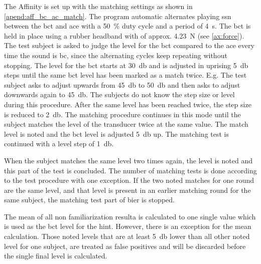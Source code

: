 The Affinity is set up with the matching settings as shown in \autoref{apend:aff_bc_ac_match}. The program automatic alternates playing \gls{ssn} between the \gls{bct} and \gls{ace} with a \SI{50}{\percent} duty cycle and a period of \SI{4}{\second}. The \gls{bct} is held in place using a rubber headband with of approx. \SI{4.23}{\newton} (see \autoref{ax:force}). The test subject is asked to judge the level for the \gls{bct} compared to the \gls{ace} every time the sound is \gls{bc}, since the alternating cycles keep repeating without stopping. The level for the \gls{bct} starts at \SI{30}{\decibel} and is adjusted in uprising \SI{5}{\decibel} steps until the same \gls{bct} level has been marked as a match twice. E.g. The test subject asks to adjust upwards from \SI{45}{\decibel} to \SI{50}{\decibel} and then asks to adjust downwards again to \SI{45}{\decibel}. The subjects do not know the step size or level during this procedure. 
After the same level has been reached twice, the step size is reduced to \SI{2}{\decibel}. The matching procedure continues in this mode until the subject matches the level of the transducer twice at the same value. The match level is noted and the  \gls{bct} level is adjusted \SI{5}{\decibel} up. The matching test is continued with a level step of \SI{1}{\decibel}.

When the subject matches the same level two times again, the level is noted and this part of the test is concluded. The number of matching tests is done according to the test procedure with one exception. If the two noted matches for one round are the same level, and that level is present in an earlier matching round for the same subject, the matching test part of \gls{bier} is stopped. 

The mean of all non familiarization resulta is calculated to one single value which is used as the \gls{bct} level for the \gls{hint}. However, there is an exception for the mean calculation. Those noted levels that are at least \SI{5}{\decibel} lower than all other noted level for one subject, are treated as false positives and will be discarded before the single final level is calculated. 



